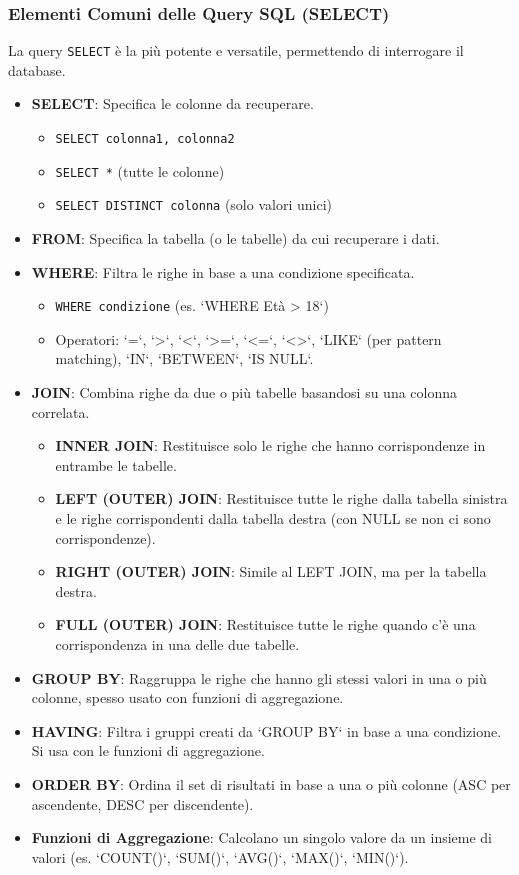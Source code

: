 \subsubsection{Elementi Comuni delle Query SQL (SELECT)}
La query \texttt{SELECT} è la più potente e versatile, permettendo di interrogare il database.
\begin{itemize}
    \item \textbf{SELECT}: Specifica le colonne da recuperare.
    \begin{itemize}
        \item \texttt{SELECT colonna1, colonna2}
        \item \texttt{SELECT *} (tutte le colonne)
        \item \texttt{SELECT DISTINCT colonna} (solo valori unici)
    \end{itemize}
    \item \textbf{FROM}: Specifica la tabella (o le tabelle) da cui recuperare i dati.
    \item \textbf{WHERE}: Filtra le righe in base a una condizione specificata.
    \begin{itemize}
        \item \texttt{WHERE condizione} (es. `WHERE Età > 18`)
        \item Operatori: `=`, `>`, `<`, `>=`, `<=`, `<>`, `LIKE` (per pattern matching), `IN`, `BETWEEN`, `IS NULL`.
    \end{itemize}
    \item \textbf{JOIN}: Combina righe da due o più tabelle basandosi su una colonna correlata.
    \begin{itemize}
        \item \textbf{INNER JOIN}: Restituisce solo le righe che hanno corrispondenze in entrambe le tabelle.
        \item \textbf{LEFT (OUTER) JOIN}: Restituisce tutte le righe dalla tabella sinistra e le righe corrispondenti dalla tabella destra (con NULL se non ci sono corrispondenze).
        \item \textbf{RIGHT (OUTER) JOIN}: Simile al LEFT JOIN, ma per la tabella destra.
        \item \textbf{FULL (OUTER) JOIN}: Restituisce tutte le righe quando c'è una corrispondenza in una delle due tabelle.
    \end{itemize}
    \item \textbf{GROUP BY}: Raggruppa le righe che hanno gli stessi valori in una o più colonne, spesso usato con funzioni di aggregazione.
    \item \textbf{HAVING}: Filtra i gruppi creati da `GROUP BY` in base a una condizione. Si usa con le funzioni di aggregazione.
    \item \textbf{ORDER BY}: Ordina il set di risultati in base a una o più colonne (ASC per ascendente, DESC per discendente).
    \item \textbf{Funzioni di Aggregazione}: Calcolano un singolo valore da un insieme di valori (es. `COUNT()`, `SUM()`, `AVG()`, `MAX()`, `MIN()`).
\end{itemize}
